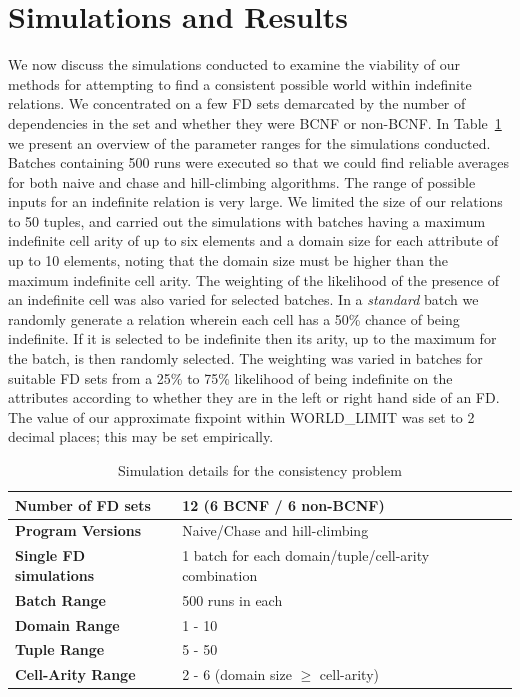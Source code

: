 \section{Simulations and Results}\label{sec:cpresults}

We now discuss the simulations conducted to examine the 
viability of our methods for attempting to find a
consistent possible world within indefinite relations.
We concentrated on a few FD sets demarcated by the number of
dependencies in the set and whether they were BCNF or non-BCNF.  
In Table~\ref{table:simpar} we present an overview of the parameter
ranges for the simulations
conducted. Batches containing 500 runs were executed so that we 
could find reliable averages for both naive and chase and
hill-climbing algorithms. The range of possible inputs for an indefinite
relation is very large. We limited the size of our relations to 50 tuples,
and carried out the simulations with batches having a maximum indefinite
cell arity of up to six elements and a domain size for each attribute of
up to 10 elements, noting that the domain size must be higher than the
maximum indefinite cell arity.  The weighting of the likelihood of the
presence of an indefinite cell was also varied for selected batches.
In a {\em standard} batch we randomly generate a relation wherein each
cell has a 50\% chance of being indefinite. If it is selected to be
indefinite then its arity, up to the maximum for the batch, is then
randomly selected. The weighting was varied in batches for suitable
FD sets from a 25\% to 75\% likelihood of being indefinite on the
attributes according to whether they are in the left or right hand side
of an FD. The value of our approximate fixpoint within WORLD\_LIMIT
was set to 2 decimal places; this may be set empirically.

{\line
\begin{table}[ht]
\begin{center}
\begin{tabular}{|l||l|}
\hline
{\bf Number of FD sets}  & 12 (6 BCNF / 6 non-BCNF) \\ \hline
{\bf Program Versions} & Naive/Chase and hill-climbing \\ \hline
{\bf Single FD simulations} & 1 batch for each domain/tuple/cell-arity combination\\ \hline
{\bf Batch Range} & 500 runs in each \\ \hline
{\bf Domain Range} & 1 - 10  \\ \hline
{\bf Tuple Range} & 5 - 50  \\ \hline 
{\bf Cell-Arity Range} & 2 - 6 (domain size $\ge$ cell-arity) \\ \hline 
\end{tabular}
\end{center}
\caption{\label{table:simpar} Simulation details for the consistency problem}
\end{table}
}



